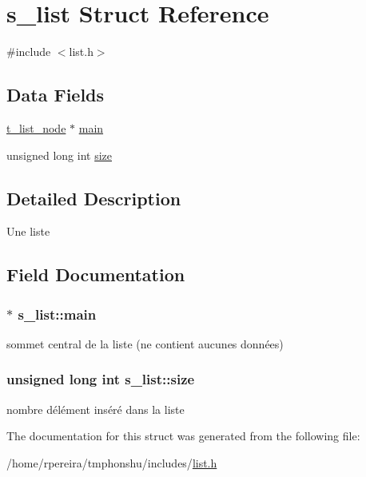 \hypertarget{structs__list}{}\section{s\+\_\+list Struct Reference}
\label{structs__list}


{\ttfamily \#include $<$list.\+h$>$}

\subsection*{Data Fields}
\begin{DoxyCompactItemize}
\item 
\hyperlink{structs__list__node}{t\+\_\+list\+\_\+node} $\ast$ \hyperlink{structs__list_a0db66d7806c2c37140b726b181003618}{main}
\item 
unsigned long int \hyperlink{structs__list_a47705c299df8f5d89cd04f1dcf51eba2}{size}
\end{DoxyCompactItemize}


\subsection{Detailed Description}
Une liste 

\subsection{Field Documentation}
\subsubsection[{\texorpdfstring{main}{main}}]{$\ast$ s\+\_\+list\+::main}\hypertarget{structs__list_a0db66d7806c2c37140b726b181003618}{}\label{structs__list_a0db66d7806c2c37140b726b181003618}
sommet central de la liste (ne contient aucunes données) 
\subsubsection[{\texorpdfstring{size}{size}}]{\setlength{\rightskip}{0pt plus 5cm}unsigned long int s\+\_\+list\+::size}\hypertarget{structs__list_a47705c299df8f5d89cd04f1dcf51eba2}{}\label{structs__list_a47705c299df8f5d89cd04f1dcf51eba2}
nombre d\textquotesingle{}élément inséré dans la liste 

The documentation for this struct was generated from the following file\+:\begin{DoxyCompactItemize}
\item 
/home/rpereira/tmphonshu/includes/\hyperlink{list_8h}{list.\+h}\end{DoxyCompactItemize}
